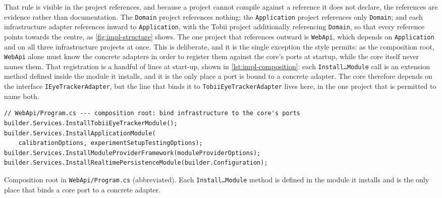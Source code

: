 That rule is visible in the project references, and because a project cannot compile against a reference it does not declare, the references are evidence rather than documentation.
The \texttt{Domain} project references nothing; the \texttt{Application} project references only \texttt{Domain}; and each infrastructure adapter references inward to \texttt{Application}, with the Tobii project additionally referencing \texttt{Domain}, so that every reference points towards the centre, as \cref{fig:impl-structure} shows.
The one project that references outward is \texttt{WebApi}, which depends on \texttt{Application} and on all three infrastructure projects at once.
This is deliberate, and it is the single exception the style permits: as the composition root, \texttt{WebApi} alone must know the concrete adapters in order to register them against the core's ports at startup, while the core itself never names them.
That registration is a handful of lines at start-up, shown in \cref{lst:impl-composition}: each \texttt{Install\dots Module} call is an extension method defined inside the module it installs, and it is the only place a port is bound to a concrete adapter.
The core therefore depends on the interface \texttt{IEyeTrackerAdapter}, but the line that binds it to \texttt{TobiiEyeTrackerAdapter} lives here, in the one project that is permitted to name both.

\begin{listing}[htbp]
\begin{verbatim}
// WebApi/Program.cs --- composition root: bind infrastructure to the core's ports
builder.Services.InstallTobiiEyeTrackerModule();
builder.Services.InstallApplicationModule(
    calibrationOptions, experimentSetupTestingOptions);
builder.Services.InstallModuleProviderFramework(moduleProviderOptions);
builder.Services.InstallRealtimePersistenceModule(builder.Configuration);
\end{verbatim}
\caption{Composition root in \texttt{WebApi/Program.cs} (abbreviated). Each \texttt{Install\dots Module} method is defined in the module it installs and is the only place that binds a core port to a concrete adapter.}
\label{lst:impl-composition}
\end{listing}

